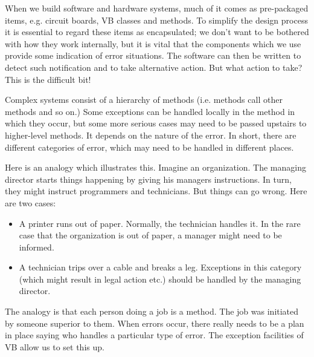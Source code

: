 		When we build software and hardware systems, much of it comes as pre-packaged items, e.g. circuit boards, VB classes and methods. To simplify the design process it is essential to regard these items as encapsulated; we don't want to be bothered with how they work internally, but it is vital that the components which we use provide some indication of error situations. The software can then be written to detect such notification and to take alternative action. But what action to take? This is the difficult bit!
		
		Complex systems consist of a hierarchy of methods (i.e. methods call other methods and so on.) Some exceptions can be handled locally in the method in which they occur, but some more serious cases may need to be passed upstairs to higher-level methods. It depends on the nature of the error. In short, there are different categories of error, which may need to be handled in different places.

		Here is an analogy which illustrates this. Imagine an organization. The managing director starts things happening by giving his managers instructions. In turn, they might instruct programmers and technicians. But things can go wrong. Here are two cases:
		\begin{itemize}
      \item A printer runs out of paper. Normally, the technician handles it. In the rare case that the organization is out of paper, a manager might need to be informed.
      \item A technician trips over a cable and breaks a leg. Exceptions in this category (which might result in legal action etc.) should be handled by the managing director.
		\end{itemize}
		The analogy is that each person doing a job is a method. The job was initiated by someone superior to them. When errors occur, there really needs to be a plan in place saying who handles a particular type of error. The exception facilities of VB allow us to set this up.
		
